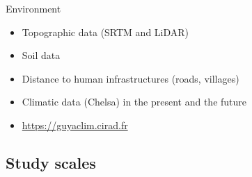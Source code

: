 \documentclass[
  10pt,
  ignorenonframetext,
  table, dvipsname, compress]{beamer}
\providecommand{\tightlist}{%
  \setlength{\itemsep}{0pt}\setlength{\parskip}{0pt}}
\begin{document}
\begin{frame}{Environment}
\protect\hypertarget{environment}{}
\begin{itemize}
\tightlist
\item
  Topographic data (SRTM and LiDAR)
\item
  Soil data
\item
  Distance to human infrastructures (roads, villages)
\item
  Climatic data (Chelsa) in the present and the future
\item
  \url{https://guyaclim.cirad.fr}
\end{itemize}
\end{frame}

\hypertarget{study-scales}{%
\subsection{Study scales}\label{study-scales}}
\end{document}
